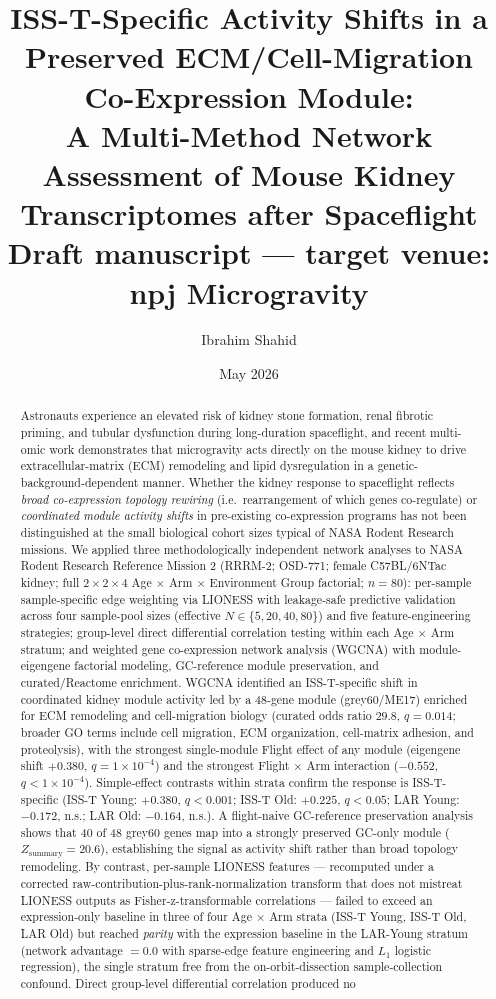 \documentclass[11pt]{article}
\title{\textbf{ISS-T-Specific Activity Shifts in a Preserved ECM/Cell-Migration Co-Expression Module: \\
A Multi-Method Network Assessment of Mouse Kidney Transcriptomes after Spaceflight}\\[0.4em]
\large Draft manuscript --- target venue: \textnormal{npj Microgravity}}
\author[1]{Ibrahim Shahid}
\author[1,*]{}
\affil[1]{Independent research, manuscript in preparation}
\affil[*]{Senior author placeholder pending PI involvement}
\date{May 2026}
\begin{document}
\maketitle

\begin{abstract}
\noindent
Astronauts experience an elevated risk of kidney stone formation, renal fibrotic priming, and tubular dysfunction during long-duration spaceflight, and recent multi-omic work demonstrates that microgravity acts directly on the mouse kidney to drive extracellular-matrix (ECM) remodeling and lipid dysregulation in a genetic-background-dependent manner. Whether the kidney response to spaceflight reflects \emph{broad co-expression topology rewiring} (i.e.\ rearrangement of which genes co-regulate) or \emph{coordinated module activity shifts} in pre-existing co-expression programs has not been distinguished at the small biological cohort sizes typical of NASA Rodent Research missions. We applied three methodologically independent network analyses to NASA Rodent Research Reference Mission 2 (RRRM-2; OSD-771; female C57BL/6NTac kidney; full $2\times 2\times 4$ Age $\times$ Arm $\times$ Environment Group factorial; $n{=}80$): per-sample sample-specific edge weighting via LIONESS with leakage-safe predictive validation across four sample-pool sizes (effective $N\in\{5,20,40,80\}$) and five feature-engineering strategies; group-level direct differential correlation testing within each Age $\times$ Arm stratum; and weighted gene co-expression network analysis (WGCNA) with module-eigengene factorial modeling, GC-reference module preservation, and curated/Reactome enrichment. WGCNA identified an ISS-T-specific shift in coordinated kidney module activity led by a 48-gene module (grey60/ME17) enriched for ECM remodeling and cell-migration biology (curated odds ratio $29.8$, $q{=}0.014$; broader GO terms include cell migration, ECM organization, cell-matrix adhesion, and proteolysis), with the strongest single-module Flight effect of any module (eigengene shift $+0.380$, $q{=}1\times 10^{-4}$) and the strongest Flight $\times$ Arm interaction ($-0.552$, $q<1\times 10^{-4}$). Simple-effect contrasts within strata confirm the response is ISS-T-specific (ISS-T Young: $+0.380$, $q<0.001$; ISS-T Old: $+0.225$, $q<0.05$; LAR Young: $-0.172$, n.s.; LAR Old: $-0.164$, n.s.). A flight-naive GC-reference preservation analysis shows that 40 of 48 grey60 genes map into a strongly preserved GC-only module ($Z_{\text{summary}}{=}20.6$), establishing the signal as activity shift rather than broad topology remodeling. By contrast, per-sample LIONESS features --- recomputed under a corrected raw-contribution-plus-rank-normalization transform that does not mistreat LIONESS outputs as Fisher-z-transformable correlations --- failed to exceed an expression-only baseline in three of four Age $\times$ Arm strata (ISS-T Young, ISS-T Old, LAR Old) but reached \emph{parity} with the expression baseline in the LAR-Young stratum (network advantage $=0.0$ with sparse-edge feature engineering and $L_1$ logistic regression), the single stratum free from the on-orbit-dissection sample-collection confound. Direct group-level differential correlation produced no 
\end{abstract}
\end{document}
